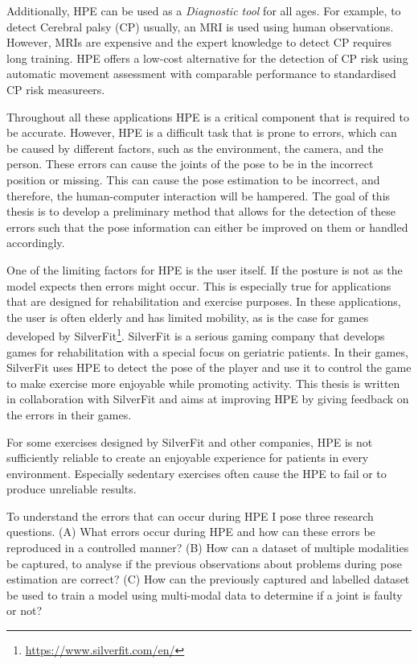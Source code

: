 Additionally, HPE can be used as a \textit{Diagnostic tool} for all ages. For example, to detect Cerebral palsy (CP) usually, an MRI is used using human observations. However, MRIs are expensive and the expert knowledge to detect CP requires long training. HPE offers a low-cost alternative for the detection of CP risk using automatic movement assessment with comparable performance to standardised CP risk measureers\cite{Stenum2021ApplicationsOP}.

Throughout all these applications HPE is a critical component that is required to be accurate. However, HPE is a difficult task that is prone to errors\cite{HPEIsHard}, which can be caused by different factors, such as the environment, the camera, and the person. These errors can cause the joints of the pose to be in the incorrect position or missing. This can cause the pose estimation to be incorrect, and therefore, the human-computer interaction will be hampered. The goal of this thesis is to develop a preliminary method that allows for the detection of these errors such that the pose information can either be improved on them or handled accordingly.

One of the limiting factors for HPE is the user itself. If the posture is not as the model expects then errors might occur. This is especially true for applications that are designed for rehabilitation and exercise purposes. In these applications, the user is often elderly and has limited mobility, as is the case for games developed by SilverFit\footnote{\url{https://www.silverfit.com/en/}}. SilverFit is a serious gaming company that develops games for rehabilitation with a special focus on geriatric patients. In their games, SilverFit uses HPE to detect the pose of the player and use it to control the game to make exercise more enjoyable while promoting activity. This thesis is written in collaboration with SilverFit and aims at improving HPE by giving feedback on the errors in their games.

For some exercises designed by SilverFit and other companies, HPE is not sufficiently reliable to create an enjoyable experience for patients in every environment. Especially sedentary exercises often cause the HPE to fail or to produce unreliable results.

To understand the errors that can occur during HPE I pose three research questions. (A) What errors occur during HPE and how can these errors be reproduced in a controlled manner? (B) How can a dataset of multiple modalities be captured, to analyse if the previous observations about problems during pose estimation are correct? (C) How can the previously captured and labelled dataset be used to train a model using multi-modal data to determine if a joint is faulty or not? 

